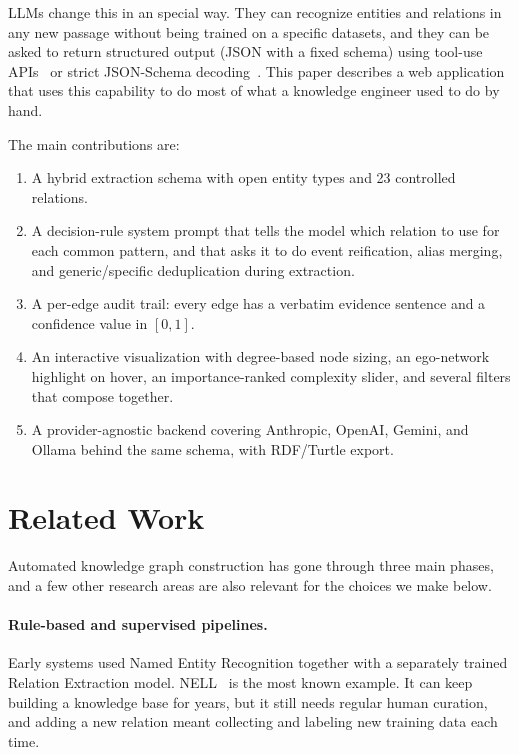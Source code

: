\documentclass[11pt,a4paper]{article}
\begin{document}
LLMs change this in an special way. They can recognize entities and relations in any new passage without being trained on a specific datasets, and they can be asked to return structured output (JSON with a fixed schema) using tool-use APIs~\cite{anthropic2024toolUse} or strict JSON-Schema decoding~\cite{openai2024structured}. This paper describes a web application that uses this capability to do most of what a knowledge engineer used to do by hand.

The main contributions are:
\begin{enumerate}[leftmargin=1.8em]
  \item A hybrid extraction schema with open entity types and 23 controlled relations.
  \item A decision-rule system prompt that tells the model which relation to use for each common pattern, and that asks it to do event reification, alias merging, and generic/specific deduplication during extraction.
  \item A per-edge audit trail: every edge has a verbatim evidence sentence and a confidence value in $[0,1]$.
  \item An interactive visualization with degree-based node sizing, an ego-network highlight on hover, an importance-ranked complexity slider, and several filters that compose together.
  \item A provider-agnostic backend covering Anthropic, OpenAI, Gemini, and Ollama behind the same schema, with RDF/Turtle export.
\end{enumerate}

\section{Related Work}\label{sec:related}

Automated knowledge graph construction has gone through three main phases, and a few other research areas are also relevant for the choices we make below.

\paragraph{Rule-based and supervised pipelines.}
Early systems used Named Entity Recognition together with a separately trained Relation Extraction model. NELL~\cite{mitchell2018neverending} is the most known example. It can keep building a knowledge base for years, but it still needs regular human curation, and adding a new relation meant collecting and labeling new training data each time.
\end{document}
